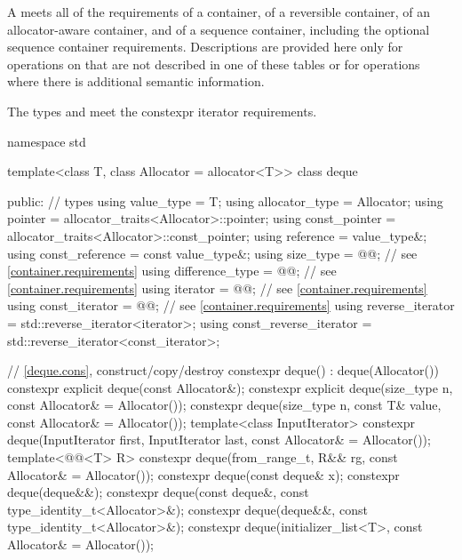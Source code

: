\pnum
A  meets all of the requirements
of a container,
of a reversible container,
of an allocator-aware container, and
of a sequence container,
including the optional sequence container requirements.
Descriptions are provided here only for operations on
that are not described in one of these tables
or for operations where there is additional semantic information.

\pnum
The types  and  meet
the constexpr iterator requirements.

\begin{codeblock}
namespace std {
  template<class T, class Allocator = allocator<T>>
  class deque {
  public:
    // types
    using value_type             = T;
    using allocator_type         = Allocator;
    using pointer                = allocator_traits<Allocator>::pointer;
    using const_pointer          = allocator_traits<Allocator>::const_pointer;
    using reference              = value_type&;
    using const_reference        = const value_type&;
    using size_type              = @@; // see \ref{container.requirements}
    using difference_type        = @@; // see \ref{container.requirements}
    using iterator               = @@; // see \ref{container.requirements}
    using const_iterator         = @@; // see \ref{container.requirements}
    using reverse_iterator       = std::reverse_iterator<iterator>;
    using const_reverse_iterator = std::reverse_iterator<const_iterator>;

    // \ref{deque.cons}, construct/copy/destroy
    constexpr deque() : deque(Allocator()) { }
    constexpr explicit deque(const Allocator&);
    constexpr explicit deque(size_type n, const Allocator& = Allocator());
    constexpr deque(size_type n, const T& value, const Allocator& = Allocator());
    template<class InputIterator>
      constexpr deque(InputIterator first, InputIterator last, const Allocator& = Allocator());
    template<@@<T> R>
      constexpr deque(from_range_t, R&& rg, const Allocator& = Allocator());
    constexpr deque(const deque& x);
    constexpr deque(deque&&);
    constexpr deque(const deque&, const type_identity_t<Allocator>&);
    constexpr deque(deque&&, const type_identity_t<Allocator>&);
    constexpr deque(initializer_list<T>, const Allocator& = Allocator());

}}
\end{codeblock}
